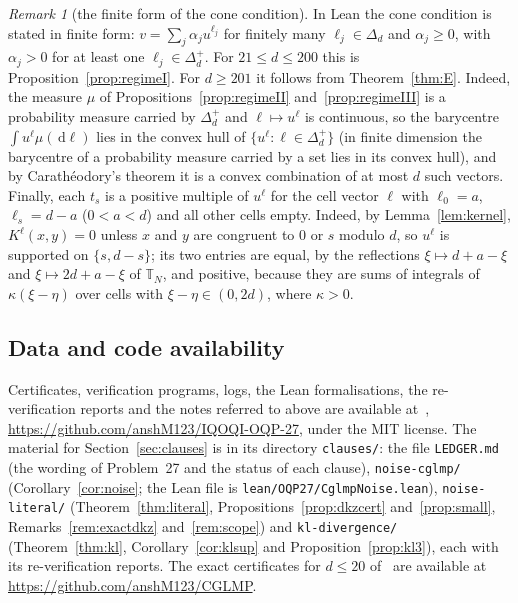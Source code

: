 \documentclass[11pt]{amsart}
\theoremstyle{definition}
\theoremstyle{remark}
\newtheorem{remark}[theorem]{Remark}
\numberwithin{equation}{section}
\newcommand{\T}{\mathbb{T}}
\newcommand{\dd}{\,\mathrm{d}}
\begin{document}
\begin{remark}[the finite form of the cone condition]\label{rem:finiteform}
In Lean the cone condition is stated in finite form: $v=\sum_j\alpha_ju^{\ell_j}$ for finitely many $\ell_j\in\Delta_d$
and $\alpha_j\ge0$, with $\alpha_j>0$ for at least one $\ell_j\in\Delta_d^+$. For $21\le d\le200$ this is
Proposition~\ref{prop:regimeI}. For $d\ge201$ it follows from Theorem~\ref{thm:E}. Indeed, the measure $\mu$ of Propositions~\ref{prop:regimeII}
and~\ref{prop:regimeIII} is a probability measure
carried by $\Delta_d^+$ and $\ell\mapsto u^\ell$ is continuous, so the barycentre $\int u^\ell\mu(\dd\ell)$ lies in the convex
hull of $\{u^\ell:\ell\in\Delta_d^+\}$ (in finite dimension the barycentre of a probability measure carried by a set lies
in its convex hull), and by Carath\'eodory's theorem it is a convex combination of at most $d$ such vectors. Finally,
each $t_s$ is a positive multiple of $u^\ell$ for the cell vector $\ell$ with $\ell_0=a$, $\ell_s=d-a$ ($0<a<d$) and all
other cells empty. Indeed, by Lemma~\ref{lem:kernel}, $K^\ell(x,y)=0$ unless $x$ and $y$ are congruent to $0$ or $s$
modulo $d$, so $u^\ell$ is supported on $\{s,d-s\}$; its two entries are equal, by the reflections $\xi\mapsto d+a-\xi$
and $\xi\mapsto2d+a-\xi$ of $\T_N$, and positive, because they are sums of integrals of $\kappa(\xi-\eta)$ over cells
with $\xi-\eta\in(0,2d)$, where $\kappa>0$.
\end{remark}

\subsection*{Data and code availability}
Certificates, verification programs, logs, the Lean formalisations, the re-verification reports and the
notes referred to above are available at~\cite{repo-oqp27},
\url{https://github.com/anshM123/IQOQI-OQP-27}, under the MIT license. The material for
Section~\ref{sec:clauses} is in its directory \texttt{clauses/}: the file \texttt{LEDGER.md} (the wording of
Problem~27 and the status of each clause), \texttt{noise-cglmp/} (Corollary~\ref{cor:noise}; the Lean file is
\texttt{lean/OQP27/CglmpNoise.lean}), \texttt{noise-literal/} (Theorem~\ref{thm:literal}, Propositions~\ref{prop:dkzcert}
and~\ref{prop:small}, Remarks~\ref{rem:exactdkz} and~\ref{rem:scope}) and \texttt{kl-divergence/} (Theorem~\ref{thm:kl},
Corollary~\ref{cor:klsup} and Proposition~\ref{prop:kl3}), each with its re-verification reports. The
exact certificates for $d\le20$ of~\cite{repo-cglmp} are available at \url{https://github.com/anshM123/CGLMP}.
\end{document}
